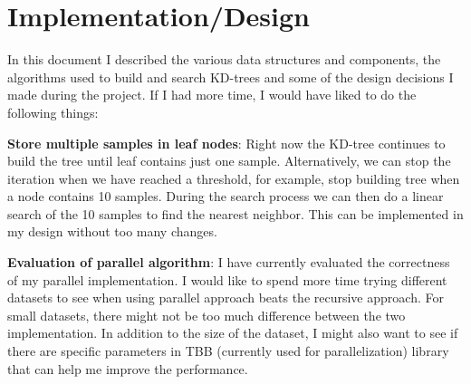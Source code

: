 \documentclass[11pt]{amsart}
\begin{document}
\section{Implementation/Design}
\label{sec:conclusion}
In this document I described the various data structures and components, the algorithms used to build and search KD-trees and some of the design decisions I made during the project. If I had more time, I would have liked to do the following things:
\begin{list}{}{\leftmargin= 1.4cm} \setlength\itemsep{1em}
\item \textbf{Store multiple samples in leaf nodes}: Right now the KD-tree continues to build the tree until leaf contains just one sample. Alternatively, we can stop the iteration when we have reached a threshold, for example, stop building tree when a node contains 10 samples. During the search process we can then do a linear search of the 10 samples to find the nearest neighbor. This can be implemented in my design without too many changes.
\item \textbf{Evaluation of parallel algorithm}: I have currently evaluated the correctness of my parallel implementation. I would like to spend more time trying different datasets to see when using parallel approach beats the recursive approach. For small datasets, there might not be too much difference between the two implementation. In addition to the size of the dataset, I might also want to see if there are specific parameters in TBB \cite{Reinders:2007:ITB:1461409} (currently used for parallelization) library that can help me improve the performance.
\end{list}


 
 
\end{document}
